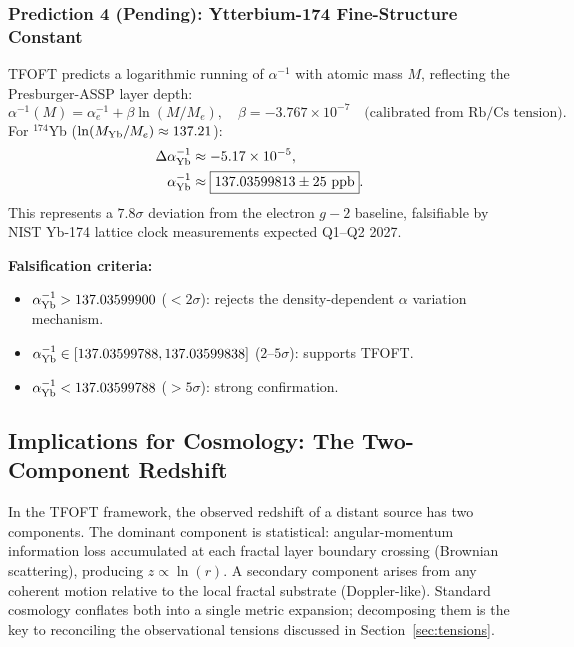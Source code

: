 \documentclass[11pt,a4paper]{article}
\begin{document}
\subsubsection{Prediction 4 (Pending): Ytterbium-174 Fine-Structure Constant}

TFOFT predicts a logarithmic running of $\alpha^{-1}$ with atomic mass $M$, reflecting the Presburger-ASSP layer depth:
\begin{equation}
\alpha^{-1}(M) = \alpha^{-1}_e + \beta \ln(M/M_e),
\quad \beta = -3.767\times10^{-7}
\quad\text{(calibrated from Rb/Cs tension)}.
\end{equation}
For $^{174}$Yb ($\ln(M_{\rm Yb}/M_e) \approx 137.21$):
\begin{align}
\Delta\alpha^{-1}_{\rm Yb} &\approx -5.17\times10^{-5}, \\
\alpha^{-1}_{\rm Yb} &\approx \boxed{137.03599813 \pm 25\ \text{ppb}}.
\end{align}
This represents a $7.8\sigma$ deviation from the electron $g-2$ baseline, falsifiable by NIST Yb-174 lattice clock measurements expected Q1--Q2 2027.

\textbf{Falsification criteria:}
\begin{itemize}
  \item $\alpha^{-1}_{\rm Yb} > 137.03599900$ ($<2\sigma$): rejects the density-dependent $\alpha$ variation mechanism.
  \item $\alpha^{-1}_{\rm Yb} \in [137.03599788, 137.03599838]$ ($2$--$5\sigma$): supports TFOFT.
  \item $\alpha^{-1}_{\rm Yb} < 137.03599788$ ($>5\sigma$): strong confirmation.
\end{itemize}

\subsection{Implications for Cosmology: The Two-Component Redshift}

In the TFOFT framework, the observed redshift of a distant source has two components. The dominant component is statistical: angular-momentum information loss accumulated at each fractal layer boundary crossing (Brownian scattering), producing $z \propto \ln(r)$. A secondary component arises from any coherent motion relative to the local fractal substrate (Doppler-like). Standard cosmology conflates both into a single metric expansion; decomposing them is the key to reconciling the observational tensions discussed in Section~\ref{sec:tensions}.
\end{document}
